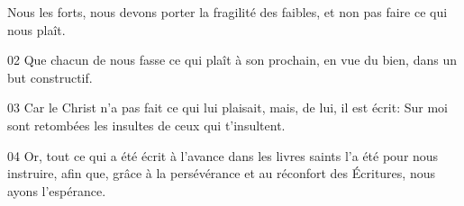 Nous les forts, nous devons porter la fragilité des faibles, et non pas faire ce qui nous plaît.

02 Que chacun de nous fasse ce qui plaît à son prochain, en vue du bien, dans un but constructif.

03 Car le Christ n’a pas fait ce qui lui plaisait, mais, de lui, il est écrit: Sur moi sont retombées les insultes de ceux qui t’insultent.

04 Or, tout ce qui a été écrit à l'avance dans les livres saints l’a été pour nous instruire, afin que, grâce à la persévérance et au réconfort des Écritures, nous ayons l’espérance.
